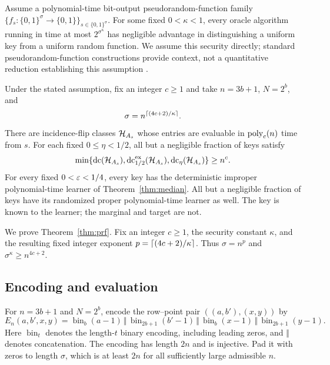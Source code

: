Assume a polynomial-time bit-output pseudorandom-function family $\{f_s:\{0,1\}^{\sigma}\to\{0,1\}\}_{s\in\{0,1\}^{\sigma}}$. For some fixed $0<\kappa<1$, every oracle algorithm running in time at most $2^{\sigma^\kappa}$ has negligible advantage in distinguishing a uniform key from a uniform random function. We assume this security directly; standard pseudorandom-function constructions provide context, not a quantitative reduction establishing this assumption \citep{GGM86}.

\begin{theorem}
\label{thm:prf}
Under the stated assumption, fix an integer $c\ge1$ and take $n=3b+1$, $N=2^b$, and
\begin{equation}
 \sigma=n^{\lceil (4c+2)/\kappa\rceil}.
\label{eq:keylength}
\end{equation}
There are incidence-flip classes $\mathcal H_{A_s}$ whose entries are evaluable in $\operatorname{poly}_c(n)$ time from $s$. For each fixed $0\le\eta<1/2$, all but a negligible fraction of keys satisfy
\begin{equation}
 \min\{\operatorname{dc}(\mathcal H_{A_s}),\operatorname{dc}^{\mathrm{ex}}_{1/2}(\mathcal H_{A_s}),\operatorname{dc}_\eta(\mathcal H_{A_s})\}\ge n^c.
\label{eq:keydim}
\end{equation}
For every fixed $0<\varepsilon<1/4$, every key has the deterministic improper polynomial-time learner of Theorem~\ref{thm:median}. All but a negligible fraction of keys have its randomized proper polynomial-time learner as well. The key is known to the learner; the marginal and target are not.
\end{theorem}

We prove Theorem~\ref{thm:prf}. Fix an integer $c\ge1$, the security constant $\kappa$, and the resulting fixed integer exponent $p=\lceil (4c+2)/\kappa\rceil$. Thus $\sigma=n^p$ and $\sigma^\kappa\ge n^{4c+2}$.

\subsection{Encoding and evaluation}
For $n=3b+1$ and $N=2^b$, encode the row--point pair $((a,b'),(x,y))$ by
\begin{equation}
 E_n(a,b',x,y)=
 \operatorname{bin}_{b}(a-1)\,\Vert\,
 \operatorname{bin}_{2b+1}(b'-1)\,\Vert\,
 \operatorname{bin}_{b}(x-1)\,\Vert\,
 \operatorname{bin}_{2b+1}(y-1).
\label{eq:ambientencoding}
\end{equation}
Here $\operatorname{bin}_t$ denotes the length-$t$ binary encoding, including leading zeros, and $\Vert$ denotes concatenation. The encoding has length $2n$ and is injective. Pad it with zeros to length $\sigma$, which is at least $2n$ for all sufficiently large admissible $n$.

